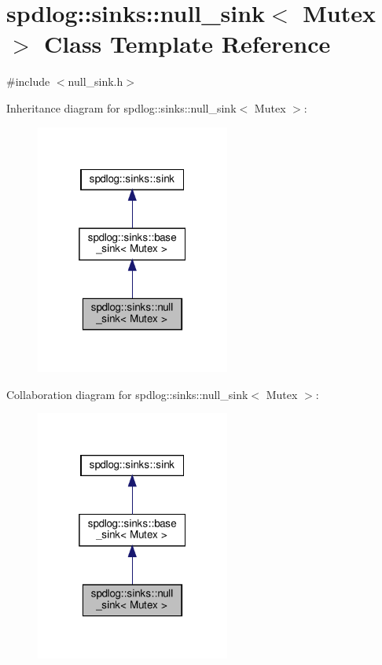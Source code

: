 \hypertarget{classspdlog_1_1sinks_1_1null__sink}{}\section{spdlog\+:\+:sinks\+:\+:null\+\_\+sink$<$ Mutex $>$ Class Template Reference}
\label{classspdlog_1_1sinks_1_1null__sink}


{\ttfamily \#include $<$null\+\_\+sink.\+h$>$}



Inheritance diagram for spdlog\+:\+:sinks\+:\+:null\+\_\+sink$<$ Mutex $>$\+:
\nopagebreak
\begin{figure}[H]
\begin{center}
\leavevmode
\includegraphics[width=181pt]{classspdlog_1_1sinks_1_1null__sink__inherit__graph}
\end{center}
\end{figure}


Collaboration diagram for spdlog\+:\+:sinks\+:\+:null\+\_\+sink$<$ Mutex $>$\+:
\nopagebreak
\begin{figure}[H]
\begin{center}
\leavevmode
\includegraphics[width=181pt]{classspdlog_1_1sinks_1_1null__sink__coll__graph}
\end{center}
\end{figure}
